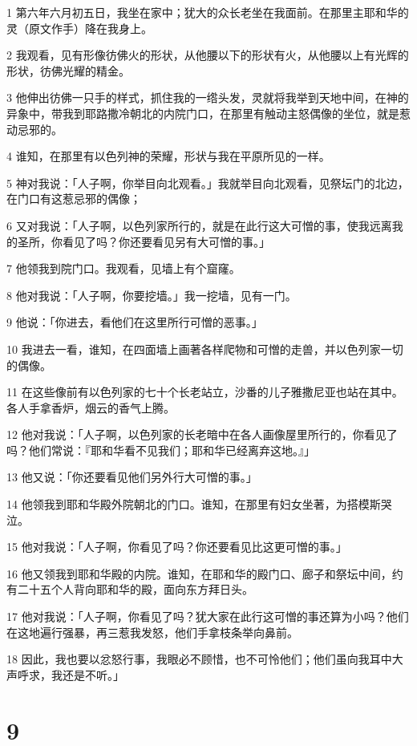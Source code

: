 \par 1 第六年六月初五日，我坐在家中；犹大的众长老坐在我面前。在那里主耶和华的灵（原文作手）降在我身上。
\par 2 我观看，见有形像彷佛火的形状，从他腰以下的形状有火，从他腰以上有光辉的形状，彷佛光耀的精金。
\par 3 他伸出彷佛一只手的样式，抓住我的一绺头发，灵就将我举到天地中间，在神的异象中，带我到耶路撒冷朝北的内院门口，在那里有触动主怒偶像的坐位，就是惹动忌邪的。
\par 4 谁知，在那里有以色列神的荣耀，形状与我在平原所见的一样。
\par 5 神对我说：「人子啊，你举目向北观看。」我就举目向北观看，见祭坛门的北边，在门口有这惹忌邪的偶像；
\par 6 又对我说：「人子啊，以色列家所行的，就是在此行这大可憎的事，使我远离我的圣所，你看见了吗？你还要看见另有大可憎的事。」
\par 7 他领我到院门口。我观看，见墙上有个窟窿。
\par 8 他对我说：「人子啊，你要挖墙。」我一挖墙，见有一门。
\par 9 他说：「你进去，看他们在这里所行可憎的恶事。」
\par 10 我进去一看，谁知，在四面墙上画著各样爬物和可憎的走兽，并以色列家一切的偶像。
\par 11 在这些像前有以色列家的七十个长老站立，沙番的儿子雅撒尼亚也站在其中。各人手拿香炉，烟云的香气上腾。
\par 12 他对我说：「人子啊，以色列家的长老暗中在各人画像屋里所行的，你看见了吗？他们常说：『耶和华看不见我们；耶和华已经离弃这地。』」
\par 13 他又说：「你还要看见他们另外行大可憎的事。」
\par 14 他领我到耶和华殿外院朝北的门口。谁知，在那里有妇女坐著，为搭模斯哭泣。
\par 15 他对我说：「人子啊，你看见了吗？你还要看见比这更可憎的事。」
\par 16 他又领我到耶和华殿的内院。谁知，在耶和华的殿门口、廊子和祭坛中间，约有二十五个人背向耶和华的殿，面向东方拜日头。
\par 17 他对我说：「人子啊，你看见了吗？犹大家在此行这可憎的事还算为小吗？他们在这地遍行强暴，再三惹我发怒，他们手拿枝条举向鼻前。
\par 18 因此，我也要以忿怒行事，我眼必不顾惜，也不可怜他们；他们虽向我耳中大声呼求，我还是不听。」

\chapter{9}

